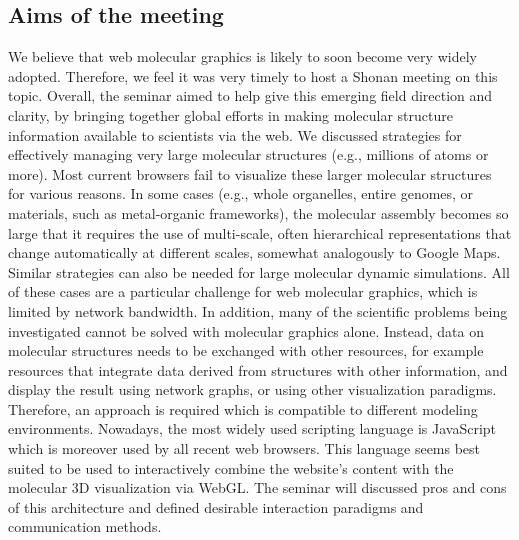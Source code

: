 \documentclass[a4paper]{article}
\begin{document}
\subsection{Aims of the meeting}
We believe that web molecular graphics is likely to soon become very widely adopted. Therefore, we feel it was very timely to host a Shonan meeting on this topic. Overall, the seminar aimed to help give this emerging field direction and clarity, by bringing together global efforts in making molecular structure information available to scientists via the web.
We discussed strategies for effectively managing very large molecular structures (e.g., millions of atoms or more). Most current browsers  fail to visualize these larger molecular structures for various reasons. In some cases (e.g., whole organelles, entire genomes, or materials, such as metal-organic frameworks), the molecular assembly becomes so large that it requires the use of multi-scale, often hierarchical representations that change automatically at different scales, somewhat analogously to Google Maps. Similar strategies can also be needed for large molecular dynamic simulations. All of these cases are a particular challenge for web molecular graphics, which is limited by network bandwidth.
In addition, many of the scientific problems being investigated cannot be solved with molecular graphics alone. Instead, data on molecular structures needs to be exchanged with other resources, for example resources that integrate data derived from structures with other information, and display the result using network graphs, or using other visualization paradigms. Therefore, an approach is required which is compatible to different modeling environments. Nowadays, the most widely used scripting language is JavaScript which is moreover used by all recent web browsers. This language seems best suited to be used to interactively combine the website's content with the molecular 3D visualization via WebGL. The seminar will discussed pros and cons of this architecture and defined desirable interaction paradigms and communication methods.

\clearpage
\end{document}
